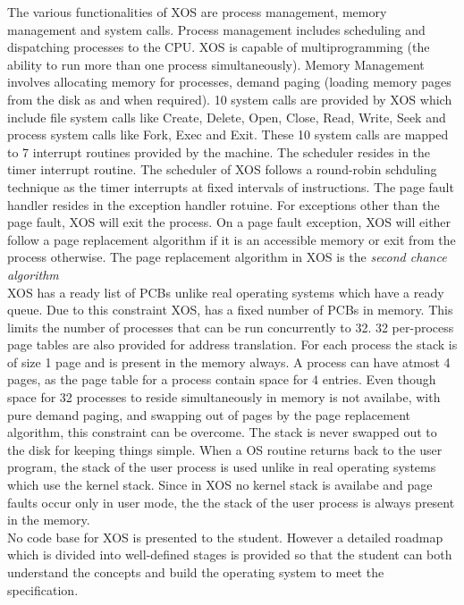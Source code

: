 \documentclass{sig-alternate}
\begin{document}
The various functionalities of XOS are process management, memory management and system calls. Process management includes scheduling and dispatching processes to the CPU. XOS is capable of multiprogramming (the ability to run more than one process simultaneously). Memory Management involves allocating memory for processes, demand paging (loading memory pages from the disk as and when required). 10 system calls are provided by XOS which include file system calls like Create, Delete, Open, Close, Read, Write, Seek and process system calls like Fork, Exec and Exit. These 10 system calls are mapped to 7 interrupt routines provided by the machine. The scheduler resides in the timer interrupt routine. The scheduler of XOS follows a round-robin schduling technique \cite{silberschatz} as the timer interrupts at fixed intervals of instructions. The page fault handler resides in the exception handler rotuine. For exceptions other than the page fault, XOS will exit the process. On a page fault exception, XOS will either follow a page replacement algorithm if it is an accessible memory or exit from the process otherwise. The page replacement algorithm in XOS is the \textit{second chance algorithm}\cite{silberschatz} \\

XOS has a ready list of PCBs unlike real operating systems which have a ready queue. Due to this constraint XOS, has a fixed number of PCBs in memory. This limits the number of processes that can be run concurrently to 32. 32 per-process page tables are also provided for address translation. For each process the stack is of size 1 page and is present in the memory always. A process can have atmost 4 pages, as the page table for a process contain space for 4 entries. Even though space for 32 processes to reside simultaneously in memory is not availabe, with pure demand paging, and swapping out of pages by the page replacement algorithm, this constraint can be overcome. The stack is never swapped out to the disk for keeping things simple. When a OS routine returns back to the user program,  the stack of the user process is used unlike in real operating systems which use the kernel stack. Since in XOS no kernel stack is availabe and page faults occur only in user mode, the the stack of the user process is always present in the memory. \\

No code base for XOS is presented to the student. However a detailed roadmap which is divided into well-defined stages is provided so that the student can both understand the concepts and build the operating system to meet the specification.
\end{document}
